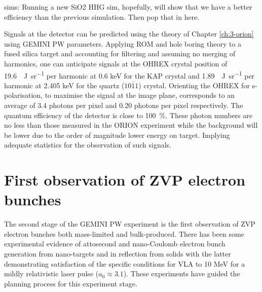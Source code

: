 sims:
Running a new SiO2 HHG sim, hopefully, will show that we have a better efficiency than the previous simulation. Then pop that in here.

Signals at the detector can be predicted using the theory of Chapter \ref{ch:3-orion} using GEMINI PW parameters. Applying ROM and hole boring theory to a fused silica target and accounting for filtering and assuming no merging of harmonics, one can anticipate signals at the OHREX crystal position of \qty{19.6}{\mu J.sr^{-1}} per harmonic at 0.6 keV for the KAP crystal and \qty{1.89}{\mu J.sr^{-1}} per harmonic at 2.405 keV for the quartz ($10\bar{1}1$) crystal. Orienting the OHREX for s-polarisation, to maximise the signal at the image plane, corresponds to an average of 3.4 photons per pixel and 0.20 photons per pixel respectively. The quantum efficiency of the detector is close to \qty{100}{\%}. These photon numbers are no less than those measured in the ORION experiment while the background will be lower due to the order of magnitude lower energy on target. Implying adequate statistics for the observation of such signals.


\section{First observation of ZVP electron bunches}\label{sec:ch4-zvp}
The second stage of the GEMINI PW experiment is the first observation of ZVP electron bunches both mass-limited and bulk-produced. There has been some experimental evidence of attosecond and nano-Coulomb electron bunch generation from nano-targets \cite{cardenasSubcycleDynamicsRelativistic2019,hornyGenerationSingleAttosecond2021} and in reflection from solids \cite{linIsolatedAttosecondElectron2020, thevenetVacuumLaserAcceleration2016} with the latter demonstrating satisfaction of the specific conditions for \ac{VLA} to 10 MeV for a mildly relativistic laser pulse ($a_0 \approx 3.1$). These experiments have guided the planning process for this experiment stage.

